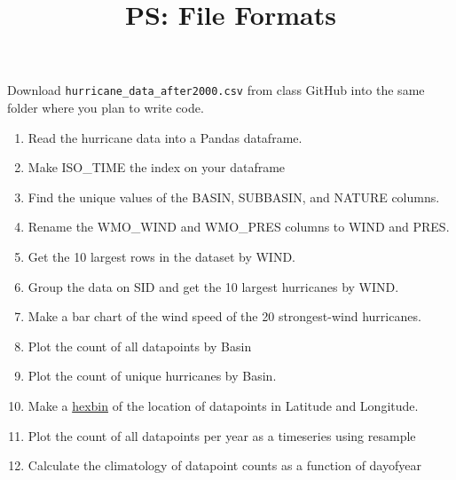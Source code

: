 \documentclass{article}
\title{\vspace{-1in} PS: File Formats}
\date{}
\newcommand{\be}{\begin{enumerate}}
\newcommand{\ee}{\end{enumerate}}
\begin{document}
\maketitle

Download \texttt{hurricane\_data\_after2000.csv} from class GitHub into the same folder where you plan to write code.

\be
\item Read the hurricane data into a Pandas dataframe.

\item Make ISO\_TIME the index on your dataframe

\item Find the unique values of the BASIN, SUBBASIN, and NATURE columns.

\item Rename the WMO\_WIND and WMO\_PRES columns to WIND and PRES.

\item Get the 10 largest rows in the dataset by WIND.

\item Group the data on SID and get the 10 largest hurricanes by WIND.

\item Make a bar chart of the wind speed of the 20 strongest-wind hurricanes.

\item Plot the count of all datapoints by Basin

\item Plot the count of unique hurricanes by Basin.

\item Make a \href{https://pandas.pydata.org/docs/reference/api/pandas.DataFrame.plot.hexbin.html}{hexbin} of the location of datapoints in Latitude and Longitude.

\item Plot the count of all datapoints per year as a timeseries using resample

\item Calculate the climatology of datapoint counts as a function of dayofyear

\ee
\end{document}
